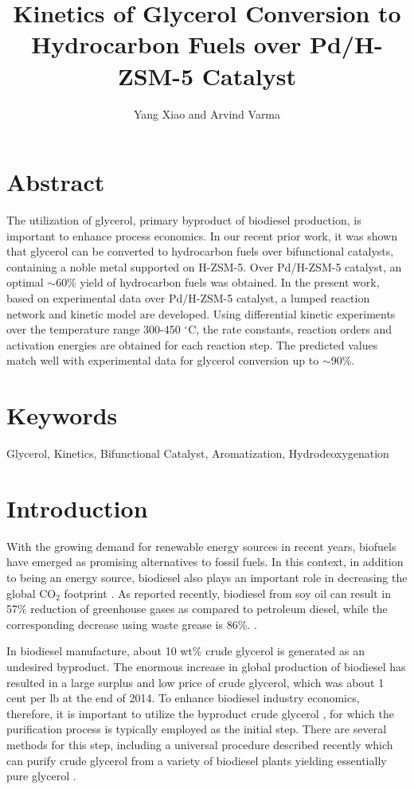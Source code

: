\documentclass[journal=iecred,manuscript=article]{achemso}
\author{Yang Xiao and Arvind Varma}
\affiliation[Purdue University]
            {Davidson School of Chemical Engineering, Purdue University, West Lafayette, IN 47907-2100}
\title[An \textsf{achemso} demo]
                  {Kinetics of Glycerol Conversion to Hydrocarbon Fuels over Pd/H-ZSM-5 Catalyst}
\begin{document}
\newpage
\section{Abstract}

The utilization of glycerol, primary byproduct of biodiesel production, is important to enhance process economics.
In our recent prior work, it was shown that glycerol can be converted to hydrocarbon fuels over bifunctional catalysts,
containing a noble metal supported on H-ZSM-5. Over Pd/H-ZSM-5 catalyst,
an optimal $\sim$60\% yield of hydrocarbon fuels was obtained.
In the present work, based on experimental data over Pd/H-ZSM-5 catalyst,
a lumped reaction network and kinetic model are developed.
Using differential kinetic experiments over the temperature range 300-450 $^{\circ}$C,
the rate constants, reaction orders and activation energies are obtained for each reaction step.
The predicted values match well with experimental data for glycerol conversion up to $\sim$90\%.

\section{Keywords}

Glycerol, Kinetics, Bifunctional Catalyst, Aromatization, Hydrodeoxygenation



\newpage
\section{Introduction}

\setlength{\parindent}{2em}
With the growing demand for renewable energy sources in recent years,
biofuels have emerged as promising alternatives to fossil fuels.
In this context, in addition to being an energy source, biodiesel also plays an important role in decreasing the global CO$_2$ footprint
\cite{Xue2011}.
As reported recently, biodiesel from soy oil can result in 57\% reduction of greenhouse gases as compared to petroleum diesel,
while the corresponding decrease using waste grease is 86\%.
\cite{EPA2010, Al_Mulali2015, Kralova2010}.

In biodiesel manufacture, about 10 wt\% crude glycerol is generated as an undesired byproduct.
The enormous increase in global production of biodiesel has resulted in a large surplus and low price of crude glycerol,
which was about 1 cent per lb at the end of 2014\cite{Ardi2015, Kong2016}.
To enhance biodiesel industry economics, therefore, it is important to utilize the byproduct crude glycerol
\cite{Thanh2012, Garlapati2016},
for which the purification process is typically employed as the initial step.  There are several methods for this step, including a universal procedure described recently which can purify crude glycerol from a variety of biodiesel plants yielding essentially pure glycerol
\cite{Xiao2013}.
\end{document}
